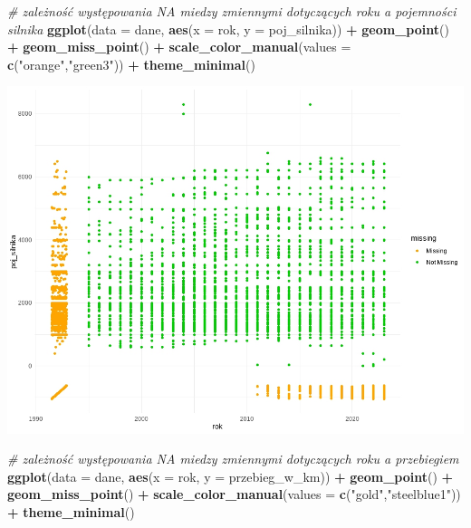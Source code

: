 \documentclass[
]{article}
\newenvironment{Shaded}{\begin{snugshade}}{\end{snugshade}}
\newcommand{\AttributeTok}[1]{\textcolor[rgb]{0.13,0.29,0.53}{#1}}
\newcommand{\CommentTok}[1]{\textcolor[rgb]{0.56,0.35,0.01}{\textit{#1}}}
\newcommand{\FunctionTok}[1]{\textcolor[rgb]{0.13,0.29,0.53}{\textbf{#1}}}
\newcommand{\NormalTok}[1]{#1}
\newcommand{\SpecialCharTok}[1]{\textcolor[rgb]{0.81,0.36,0.00}{\textbf{#1}}}
\newcommand{\StringTok}[1]{\textcolor[rgb]{0.31,0.60,0.02}{#1}}
\begin{document}
\begin{Shaded}
\begin{Highlighting}[]
\CommentTok{\# zależność występowania NA miedzy zmiennymi dotyczących roku a pojemności silnika }
\FunctionTok{ggplot}\NormalTok{(}\AttributeTok{data =}\NormalTok{ dane, }\FunctionTok{aes}\NormalTok{(}\AttributeTok{x =}\NormalTok{ rok, }\AttributeTok{y =}\NormalTok{ poj\_silnika)) }\SpecialCharTok{+} 
  \FunctionTok{geom\_point}\NormalTok{() }\SpecialCharTok{+}
  \FunctionTok{geom\_miss\_point}\NormalTok{() }\SpecialCharTok{+}
  \FunctionTok{scale\_color\_manual}\NormalTok{(}\AttributeTok{values =} \FunctionTok{c}\NormalTok{(}\StringTok{"orange"}\NormalTok{,}\StringTok{"green3"}\NormalTok{)) }\SpecialCharTok{+}
  \FunctionTok{theme\_minimal}\NormalTok{()}
\end{Highlighting}
\end{Shaded}

\includegraphics[width=1\linewidth]{images/4}

\begin{Shaded}
\begin{Highlighting}[]
\CommentTok{\# zależność występowania NA miedzy zmiennymi dotyczących roku a przebiegiem }
\FunctionTok{ggplot}\NormalTok{(}\AttributeTok{data =}\NormalTok{ dane, }\FunctionTok{aes}\NormalTok{(}\AttributeTok{x =}\NormalTok{ rok, }\AttributeTok{y =}\NormalTok{ przebieg\_w\_km)) }\SpecialCharTok{+} 
  \FunctionTok{geom\_point}\NormalTok{() }\SpecialCharTok{+}
  \FunctionTok{geom\_miss\_point}\NormalTok{() }\SpecialCharTok{+}
  \FunctionTok{scale\_color\_manual}\NormalTok{(}\AttributeTok{values =} \FunctionTok{c}\NormalTok{(}\StringTok{"gold"}\NormalTok{,}\StringTok{"steelblue1"}\NormalTok{)) }\SpecialCharTok{+}
  \FunctionTok{theme\_minimal}\NormalTok{()}
\end{Highlighting}
\end{Shaded}
\end{document}
